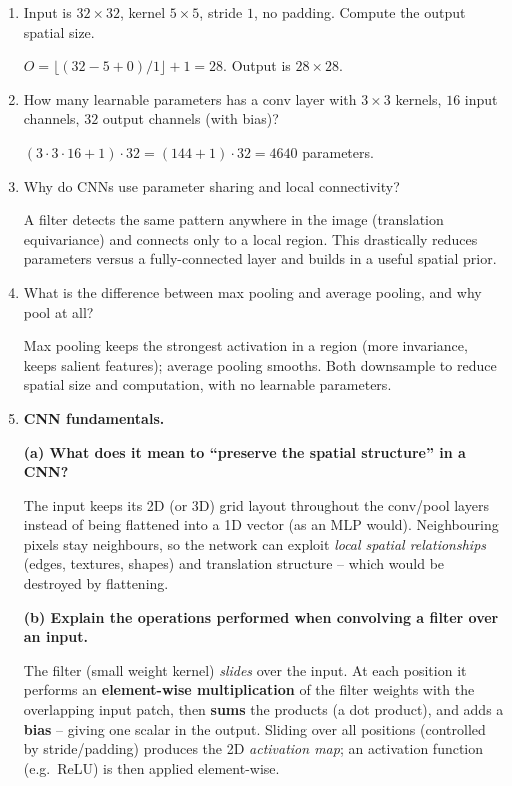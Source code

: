 \documentclass[10pt,a4paper]{article}
\newcommand{\q}[1]{\item #1}
\begin{document}
\begin{enumerate}[leftmargin=*,label=\textbf{Q\arabic*.}]

\q Input is $32\times32$, kernel $5\times5$, stride $1$, no padding. Compute the output spatial size.
\begin{answerbox}
$O = \lfloor (32 - 5 + 0)/1 \rfloor + 1 = 28$. Output is $28\times28$.
\end{answerbox}

\q How many learnable parameters has a conv layer with $3\times3$ kernels, $16$ input channels, $32$ output channels (with bias)?
\begin{answerbox}
$(3\cdot3\cdot16 + 1)\cdot 32 = (144+1)\cdot32 = 4640$ parameters.
\end{answerbox}

\q Why do CNNs use parameter sharing and local connectivity?
\begin{answerbox}
A filter detects the same pattern anywhere in the image (translation equivariance) and connects only to a local region. This drastically reduces parameters versus a fully-connected layer and builds in a useful spatial prior.
\end{answerbox}

\q What is the difference between max pooling and average pooling, and why pool at all?
\begin{answerbox}
Max pooling keeps the strongest activation in a region (more invariance, keeps salient features); average pooling smooths. Both downsample to reduce spatial size and computation, with no learnable parameters.
\end{answerbox}

\q \textbf{CNN fundamentals.}

\textbf{(a) What does it mean to ``preserve the spatial structure'' in a CNN?}
\begin{answerbox}
The input keeps its 2D (or 3D) grid layout throughout the conv/pool layers instead of being flattened into a 1D vector (as an MLP would). Neighbouring pixels stay neighbours, so the network can exploit \emph{local spatial relationships} (edges, textures, shapes) and translation structure -- which would be destroyed by flattening.
\end{answerbox}

\textbf{(b) Explain the operations performed when convolving a filter over an input.}
\begin{answerbox}
The filter (small weight kernel) \emph{slides} over the input. At each position it performs an \textbf{element-wise multiplication} of the filter weights with the overlapping input patch, then \textbf{sums} the products (a dot product), and adds a \textbf{bias} -- giving one scalar in the output. Sliding over all positions (controlled by stride/padding) produces the 2D \emph{activation map}; an activation function (e.g.\ ReLU) is then applied element-wise.
\end{answerbox}


\end{enumerate}
\end{document}

